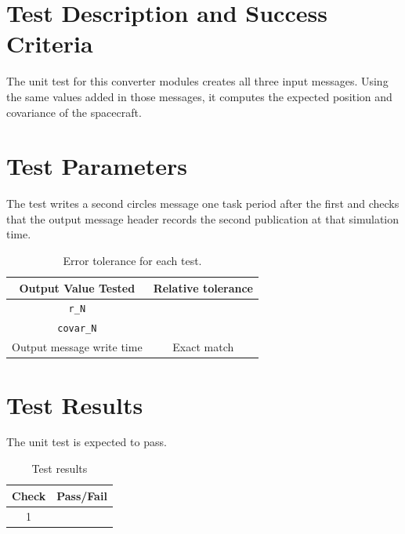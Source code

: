 
\section{Test Description and Success Criteria}

The unit test for this converter modules creates all three input messages. Using the same values added in those messages, it computes the expected position and covariance of the spacecraft.


\section{Test Parameters}

The test writes a second circles message one task period after the first and checks
that the output message header records the second publication at that simulation time.
\begin{table}[htbp]
	\caption{Error tolerance for each test.}
	\label{tab:errortol}
	\centering \fontsize{10}{10}\selectfont
	\begin{tabular}{ c | c } %
		\hline\hline
		\textbf{Output Value Tested}  & \textbf{Relative tolerance}  \\
		\hline
		{\tt r\_N}        & 	   \\
		{\tt covar\_N}        & 	   \\
		Output message write time & Exact match \\
		\hline\hline
	\end{tabular}
\end{table}

\section{Test Results}
The unit test is expected to pass.
\begin{table}[H]
	\caption{Test results}
	\label{tab:results}
	\centering \fontsize{10}{10}\selectfont
	\begin{tabular}{c | c  } %
		\hline\hline
		\textbf{Check} &\textbf{Pass/Fail} \\
		\hline
	   1	   			&  \\
	   \hline\hline
	\end{tabular}
\end{table}
